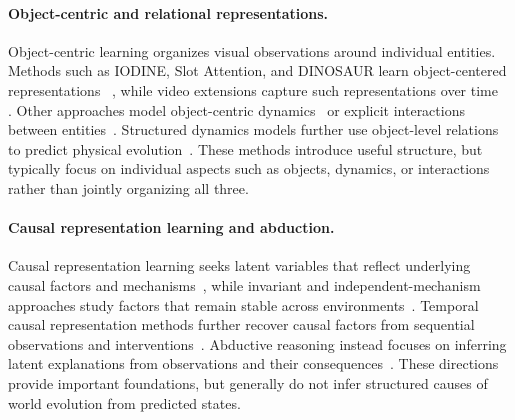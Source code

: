 \documentclass{article}
\begin{document}
\paragraph{Object-centric and relational representations.}

Object-centric learning organizes visual observations around individual entities.
Methods such as IODINE, Slot Attention, and DINOSAUR learn object-centered
representations~
\citep{greff2019iodine,locatello2020slotattention,seitzer2023dinosaurs},
while video extensions capture such representations over time~
\citep{kipf2022savi,zadaianchuk2023videosaur}.
Other approaches model object-centric dynamics~\citep{jiang2020scalor,wu2022slotformer,song2025ock} or explicit interactions between entities~\citep{battaglia2016interaction,kipf2018nri}. Structured dynamics models further use object-level relations to predict physical evolution~\citep{watters2017vin,lin2020cswm,sanchezgonzalez2020gns}. These methods introduce useful structure, but typically focus on individual aspects such as objects, dynamics, or interactions rather than jointly organizing all three.

\paragraph{Causal representation learning and abduction.}

Causal representation learning seeks latent variables that reflect underlying causal factors and mechanisms~\citep{scholkopf2021causal,khemakhem2020ivae}, while invariant and independent-mechanism approaches study factors that remain stable across environments~\citep{parascandolo2018independent,arjovsky2019irm}. Temporal causal representation methods further recover causal factors from sequential observations and interventions~\citep{lippe2022citris,lippe2023icitris}. Abductive reasoning instead focuses on inferring latent explanations from observations and their consequences~\citep{peirce1903abduction,zhou2019abductive}. These directions provide important foundations, but generally do not infer structured causes of world evolution from predicted states.




\end{document}
